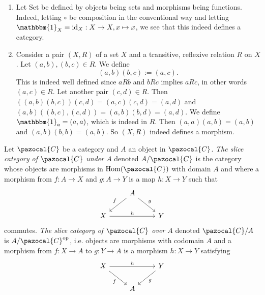\begin{example}\label{BasicExamplesOfCategories}
    \begin{enumerate}
        \item Let $\mathrm{Set}$ be defined by objects being sets and morphisms being functions. Indeed, letting $\circ$ be composition in the conventional way and letting $\mathbbm{1}_X = \mathrm{id}_X: X\rightarrow X, x\mapsto x$, we see that this indeed defines a category. 
        \item Consider a pair $(X,R)$ of a set $X$ and a transitive, reflexive relation $R$ on $X$. Let $(a,b),(b,c)\in R$. We define 
        $$(a,b)(b,c) := (a,c).$$
        This is indeed well defined since $a R b$ and $bR c$ implies $a R c$, in other words $(a,c)\in R$. Let another pair $(c,d)\in R$. Then $((a,b)(b,c))(c,d)= (a,c)(c,d) = (a,d)$ and $(a,b)((b,c),(c,d))=(a,b)(b,d)=(a,d)$. We define $\mathbbm{1}_a = (a,a)$, which is indeed in $R$. Then $(a,a)(a,b)=(a,b)$ and $(a,b)(b,b)=(a,b)$. So $(X,R)$ indeed defines a morphism. 
    \end{enumerate}
\end{example}
\begin{definition}
    Let $\pazocal{C}$ be a category and $A$ an object in $\pazocal{C}$. \textit{The slice category of $\pazocal{C}$ under $A$} denoted $A/\pazocal{C}$ is the category whose objects are morphisms in $\Hom(\pazocal{C})$ with domain $A$ and where a morphism from $f: A \rightarrow X$ and $g : A \rightarrow Y $ is a map $h : X\rightarrow Y$ such that 
    $$\begin{tikzcd}
       & A \arrow[ld, "f"' ] \arrow[rd, "g"]\\
        X \arrow{rr}{h} & & Y
    \end{tikzcd}$$
    commutes. \textit{The slice category of $\pazocal{C}$ over $A$} denoted $\pazocal{C}/A$ is $A/\pazocal{C}\op$, i.e. objects are morphisms with codomain $A$ and a morphism from $f : X \rightarrow A$ to $g : Y\rightarrow A$ is a morphism $h : X \rightarrow Y$ satisfying
    $$\begin{tikzcd}
        X \arrow[rd, "f"'] \arrow[rr, "h"] & & Y\arrow[ld, "g"]\\
        & A 
    \end{tikzcd}$$
\end{definition}
